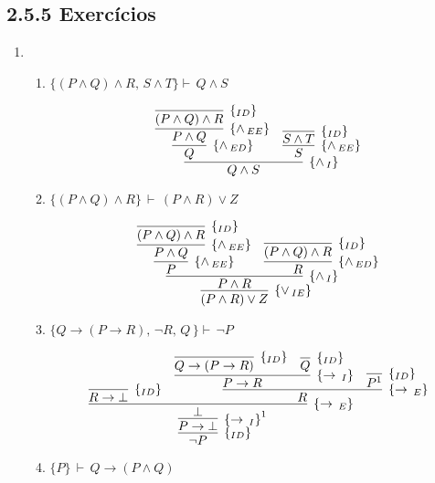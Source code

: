 \subsection{2.5.5 Exerc\'icios}
\begin{enumerate}
	\item
	\begin{enumerate}
	\item $\{(P\land Q)\land R,\, S\land T\}\vdash\,Q\land S$
	
	\[
      \infer[\andI]
               {Q\land S}
               {
                   \infer[\andED]
                            {Q}
                            {
                            \infer[\andEE]
                            		{P\land Q}
                            		{
                            			\infer[\Id]
                            				{(P\land Q)\land R}
                            				{}
                            		}
                            }
                    &  
                   \infer[\andEE]
                            {S}
                            {
	                            \infer[\Id]
	                                   {S\land T}{}
                            }
               }
 	 \]
 	 
 	 
 	 \item $\{(P\land Q)\land R\}\,\vdash\,(P\land R)\lor Z$
 	 
 	 \[
 	 	\infer[\orIE]
 	 		{(P\land R)\lor Z}
 	 		{
 	 			\infer[\andI]
 	 				{P \land R}
 	 				{
 	 					\infer[\andEE]
 	 						{P}
 	 						{
 	 							\infer[\andEE]
 	 								{P\land Q}
 	 								{\infer[\Id]{(P\land Q)\land R}{}}
 	 						}
 	 					&
 	 					\infer[\andED]
 	 						{R}
 	 						{\infer[\Id]{(P\land Q)\land R}{}}
 	 				}
 	 		}
 	 \]
 	 
 	 \item  $\{Q\rightarrow (P\rightarrow R),\, \neg R,\, Q\,\} \vdash\,\neg P$
		
	\[
		\infer[\Id]
			{\neg P}
			{
				\infer[\impI^1]
					{P \to \bot}
					{
						\infer[\impE]
							{\bot}
							{
								\infer[\Id]
									{R \to \bot}{}
							&
								\infer[\impE]
									{R}
									{
										\infer[\impI]
											{P \to R}
											{
												\infer[\Id]
													{Q \to (P \to R)}
													{}
												&
												\infer[\Id]
													{Q}
													{}
											}
										&
										\infer[\Id]
											{P^1}
											{}
									}
							}
					}
			}	
	\]
	
	\item $\{P\}\,\vdash\, Q\rightarrow(P\land Q)$
	

\end{enumerate}
\end{enumerate}
